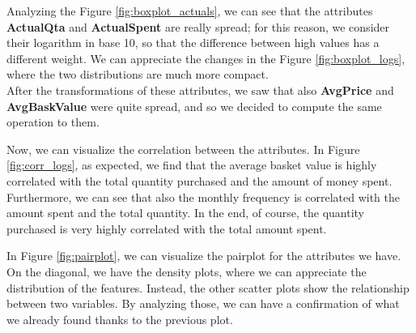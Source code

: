 Analyzing the Figure \ref{fig:boxplot_actuals}, we can see that the attributes \textbf{ActualQta} and \textbf{ActualSpent} are really spread; for this reason, we consider their logarithm in base 10, so that the difference between high values has a different weight. We can appreciate the changes in the Figure \ref{fig:boxplot_logs}, where the two distributions are much more compact.\\
After the transformations of these attributes, we saw that also \textbf{AvgPrice} and \textbf{AvgBaskValue} were quite spread, and so we decided to compute the same operation to them.

\pagebreak

Now, we can visualize the correlation between the attributes. In Figure \ref{fig:corr_logs}, as expected, we find that the average basket value is highly correlated with the total quantity purchased and the amount of money spent. Furthermore, we can see that also the monthly frequency is correlated with the amount spent and the total quantity. In the end, of course, the quantity purchased is very highly correlated with the total amount spent.

In Figure \ref{fig:pairplot}, we can visualize the pairplot for the attributes we have.\\
On the diagonal, we have the density plots, where we can appreciate the distribution of the features. Instead, the other scatter plots show the relationship between two variables. By analyzing those, we can have a confirmation of what we already found thanks to the previous plot. 

